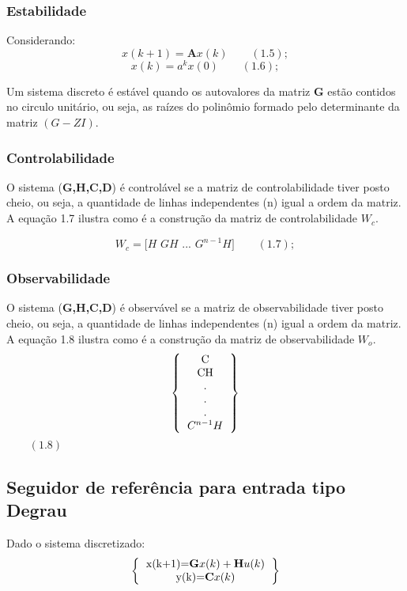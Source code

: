 \documentclass[a4paper,12pt]{article}
\begin{document}
    \subsubsection{Estabilidade}
\hspace{4ex}Considerando:
$$x(k+1)=\textbf{A}x(k)\,\,\,\,\,\,\,\,\,\,\,\ (1.5);$$
$$x(k)=a^{k}x(0)\,\,\,\,\,\,\,\,\,\,\,\ (1.6);$$

\hspace{4ex}Um sistema discreto é estável quando os autovalores da matriz \textbf{G} estão contidos no circulo unitário, ou seja, as raízes do polinômio formado pelo determinante da matriz $(G-ZI)$.
\subsubsection{Controlabilidade}
\hspace{4ex} O sistema (\textbf{G,H,C,D}) é controlável se a matriz de controlabilidade tiver posto cheio, ou seja, a quantidade de linhas independentes (n) igual a ordem da matriz. A equação 1.7 ilustra como é a construção da matriz de controlabilidade $W_{c}$.

$$W_{c}=\bigg[ H\,\, GH\,\,...\,\,G^{n-1}H\bigg]\,\,\,\,\,\,\,\,\,\,\,\ (1.7);$$
\subsubsection{Observabilidade}
\hspace{4ex}O sistema (\textbf{G,H,C,D}) é observável se a matriz de observabilidade tiver posto cheio, ou seja, a quantidade de linhas independentes (n) igual a ordem da matriz. A equação 1.8 ilustra como é a construção da matriz de observabilidade $W_{o}$.
\[ 
\left \{
  \begin{tabular}{c}
  C  \\
  CH \\
  .  \\ 
  .  \\ 
  .  \\
  $C^{n-1}H$
  \end{tabular}
\right \}
\]$\,\,\,\,\,\,\,\,\,\,\,\ (1.8)$
\subsection{Seguidor de referência para entrada tipo Degrau}
\hspace{4ex}Dado o sistema discretizado:
\[ 
\left \{
  \begin{tabular}{c}
  x(k+1)=$\textbf{G}x(k)+\textbf{H}u(k)$ \\
  y(k)=$\textbf{C}x(k)$
  \end{tabular}
\right \}
\]
\end{document}
